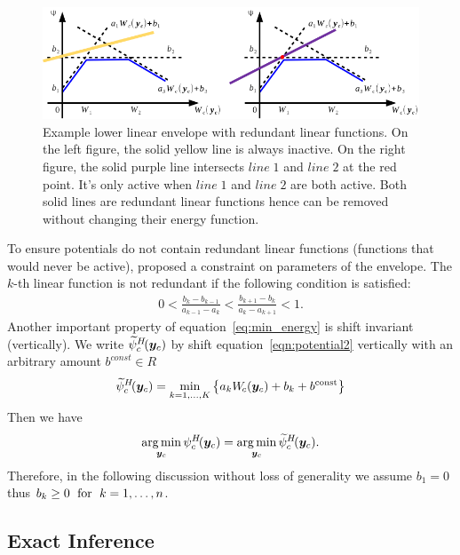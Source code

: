 \begin{figure}[ht]
  \centering
  \includegraphics[width=1\columnwidth]{Part2/figures/redundant}
  \caption{\label{fig:redundant} Example lower linear envelope
    with redundant linear functions. On the left figure, the
    solid yellow line is always inactive. On the right figure,
    the solid purple line intersects $line \; 1$ and $line \; 2$
    at the red point. It's only active when $line \; 1$ and $line
    \; 2$ are both active. Both solid lines are redundant linear
    functions hence can be removed without changing their energy
    function.}
\end{figure}
%

To ensure potentials do not contain redundant linear functions
(functions that would never be active), 
proposed a constraint on parameters of the envelope. The $k$-th
linear function is not redundant if the following condition is
satisfied:
%
\begin{align}
    0
    <
    \frac{b_k - b_{k-1}}{a_{k-1} - a_k}
    <
    \frac{b_{k+1} - b_k}{a_k - a_{k+1}}
    <
    1.
  \label{eq:nonredundant}
\end{align}
%
Another important property of equation~\eqref{eq:min_energy} is
shift invariant (vertically). We write
$\widetilde{\psi}^{H}_c\!({\bm{y}}_c)$ by shift
equation~\eqref{eqn:potential2} vertically with an arbitrary
amount $b^{const}\in R$
$$\widetilde{\psi}^{H}_c\!({\bm{y}}_c) = \min_{k=1, \ldots, K}
\left\{a_k W_{\!c}({\bm{y}}_c) + b_k + b^\textrm{const} \right\}$$
%
Then we have
\begin{align}
  \operatorname*{arg\,min}_{{\bm{y}}_c} \psi^H_c\!({\bm{y}}_c)
  = \operatorname*{arg\,min}_{{\bm{y}}_c} \widetilde{\psi}^{H}_c\!({\bm{y}}_c).
  \label{eq:shift_invariant}
\end{align}
%
Therefore, in the following discussion without loss of generality
we assume $b_1 = 0$ thus $b_k\geq0 \text{\; for \;} k=1,\dots,n$.

\subsection{Exact Inference}
\label{sec:exact_inference}

